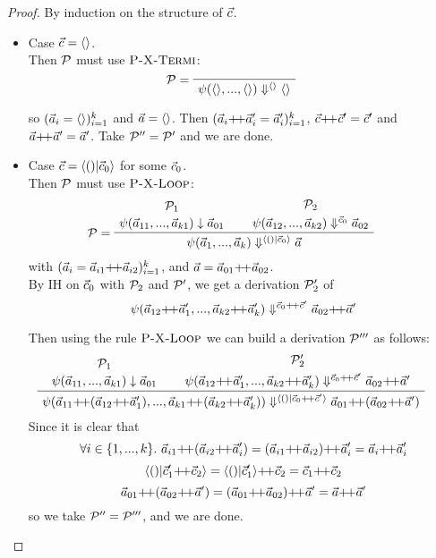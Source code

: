 \begin{proof}
\def\cc{\c {\++} \c'}
\def\aap#1{\a_{#1} {\++} \a_{#1}'}

	By induction on the structure of $\vec c$. 
	\begin{itemize}
		\item Case $\vec c = \langle \rangle$. \\
		Then $\mathcal{P}$ must use $\textsc{P-X-Termi}$:
		$$\PT{\LeLa{\MP = }
			  \Axiom{\sevalf{\emptyv}{\emptyv}{\emptyv}{\emptyv}}
		  }$$
		
		so $(\vec a_i=\langle \rangle)^k_{i=1}$ and $\vec a = \langle \rangle$.
		Then $\k{\aap{i} = \a_i'}$, $\cc = \c' $ and $\a {\++} \a' = \a'$. Take $\mathcal{P}''
		= \mathcal{P}'$ and we are done. 
		
		\item Case $\c = \< () | \c_0 \'>$ for some $\vec c_0$. \\ 
		Then $\mathcal{P}$ must use $\textsc{P-X-Loop}$: 
		$$
		\PT{
			\UCN{\MP_1}{\block{\a_{11}}{\a_{k1}}{\a_{01}}}
			\UCN{\MP_2}{\sevalf{\a_{12}}{\a_{k2}}{\c_0}{\a_{02}}}
 			\LeLa{\MP = }
			\BC{\sevalf{\a_1}{\a_k}{\< () | \c_0 \'>}{\a}}
		}$$
	    with $\k{\a_i = \vapp{\a_{i1}}{\a_{i2}}}$, and $\a = \a_{01} {\++} \a_{02}$.\\
	    
	    By IH on $\vec c_0$ with $\mathcal{P}_2$ and $\mathcal{P}'$, we get a derivation $\mathcal{P}'_2$ of 
	    $$\sevalfg{\lcall}{\a_{12} {\++} \a_1',...,\a_{k2} {\++} \a_k'}{\c_0 {\++} \c' }{\a_{02} {\++} \a'}$$
	    
	    Then using the rule $\textsc{P-X-Loop}$ we can build a derivation $\mathcal{P}'''$ as follows:
	    	$$
	    \PT{
	    	\UCN{\MP_{1}}{\block{\a_{11}}{\a_{k1}}{\a_{01}}}
	    	\UCN{\MP'_{2}}{\sevalfg{\lcall}{\a_{12} {\++} \a_1',...,\a_{k2} {\++} \a_k'}{\c_0 {\++} \c' }{\a_{02} {\++} \a'}}
	    	\BC{\sevalf{\a_{11} {\++} {(\a_{12} {\++} \a_1')}}
	    		        {\a_{k1} {\++} {(\a_{k2} {\++} \a_k')}}
	    		        {\< () | \c_0 {\++} \c' \'>}
	    		        {\a_{01} {\++} {(\a_{02} {\++} \a')}}}
	    }$$
	    Since it is clear that 
	    $$\forall i \in \{1,...,k\}. \ \a_{i1} {\++} (\a_{i2} {\++} \a_i') = (\a_{i1} {\++} \a_{i2}) {\++} \a_i' = \a_i {\++} \a_i' $$
	    $$ \< () | \c_1' {\++} \c_2 \'> = \< () | \c_1' \'> {\++} \c_2 = \c_1 {\++} \c_2 $$
	    $$ \a_{01} {\++} (\a_{02} {\++} \a') = (\a_{01} {\++} \a_{02}) {\++} \a' = \a {\++}  \a' $$
	    so we take $\mathcal{P}'' = \mathcal{P}'''$, and we are done. 
	    
	\end{itemize}
	
\end{proof}

